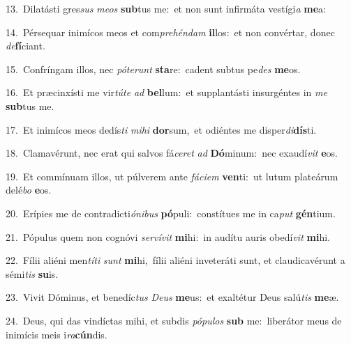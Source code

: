 {\numbfont\textcolor{\numbcolor}{13.}}~Dilatásti gres\textit{sus} \textit{me}\-\textit{os} \textbf{sub}\-tus me:~\star et non sunt infirmáta vestígi\textit{a} \textbf{me}\-a:\par
{\numbfont\textcolor{\numbcolor}{14.}}~Pérsequar inimícos meos et com\-\textit{pre}\-\textit{hén}\textit{dam} \textbf{il}\-los:~\star et non convértar, donec \textit{de}\-\textbf{fí}ciant.\par
{\numbfont\textcolor{\numbcolor}{15.}}~Confríngam illos, nec \textit{pót}\-\textit{e}\textit{runt} \textbf{sta}\-re:~\star cadent subtus pe\textit{des} \textbf{me}\-os.\par
{\numbfont\textcolor{\numbcolor}{16.}}~Et præcinxísti me vir\-\textit{tú}\-\textit{te} \textit{ad} \textbf{bel}\-lum:~\star et supplantásti insurgéntes in \textit{me} \textbf{sub}\-tus me.\par
{\numbfont\textcolor{\numbcolor}{17.}}~Et inimícos meos dedís\textit{ti} \textit{mi}\-\textit{hi} \textbf{dor}\-sum,~\star et odiéntes me disper\-\textit{di}\-\textbf{dís}ti.\par
{\numbfont\textcolor{\numbcolor}{18.}}~Clamavérunt, nec erat qui salvos fá\-\textit{ce}\-\textit{ret} \textit{ad} \textbf{Dó}\-minum:~\star nec exaudí\textit{vit} \textbf{e}\-os.\par
{\numbfont\textcolor{\numbcolor}{19.}}~Et commínuam illos, ut púlverem ante \textit{fá}\-\textit{ci}\textit{em} \textbf{ven}\-ti:~\star ut lutum plateárum delé\textit{bo} \textbf{e}\-os.\par
{\numbfont\textcolor{\numbcolor}{20.}}~Erípies me de contradicti\-\textit{ó}\-\textit{ni}\textit{bus} \textbf{pó}\-puli:~\star constítues me in ca\textit{put} \textbf{gén}\-tium.\par
{\numbfont\textcolor{\numbcolor}{21.}}~Pópulus quem non cognóvi \textit{ser}\-\textit{ví}\textit{vit} \textbf{mi}\-hi:~\star in audítu auris obedí\textit{vit} \textbf{mi}\-hi.\par
{\numbfont\textcolor{\numbcolor}{22.}}~Fílii aliéni men\-\textit{tí}\-\textit{ti} \textit{sunt} \textbf{mi}\-hi,~\star fílii aliéni inveteráti sunt, et claudicavérunt a sémi\textit{tis} \textbf{su}\-is.\par
{\numbfont\textcolor{\numbcolor}{23.}}~Vivit Dóminus, et benedíc\textit{tus} \textit{De}\-\textit{us} \textbf{me}\-us:~\star et exaltétur Deus salú\textit{tis} \textbf{me}\-æ.\par
{\numbfont\textcolor{\numbcolor}{24.}}~Deus, qui das vindíctas mihi, et subdis \textit{pó}\-\textit{pu}\textit{los} \textbf{sub} me:~\star liberátor meus de inimícis meis i\-\textit{ra}\-\textbf{cún}dis.\par
